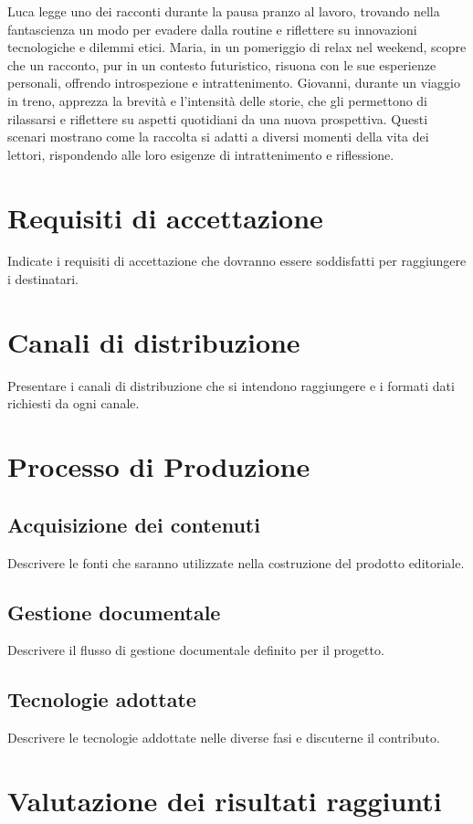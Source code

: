 \documentclass[a4paper,12pt]{article}
\begin{document}
Luca legge uno dei racconti durante la pausa pranzo al lavoro, trovando nella fantascienza un modo per evadere dalla routine e riflettere su innovazioni tecnologiche e dilemmi etici. Maria, in un pomeriggio di relax nel weekend, scopre che un racconto, pur in un contesto futuristico, risuona con le sue esperienze personali, offrendo introspezione e intrattenimento. Giovanni, durante un viaggio in treno, apprezza la brevità e l'intensità delle storie, che gli permettono di rilassarsi e riflettere su aspetti quotidiani da una nuova prospettiva. Questi scenari mostrano come la raccolta si adatti a diversi momenti della vita dei lettori, rispondendo alle loro esigenze di intrattenimento e riflessione.

\section*{Requisiti di accettazione}
Indicate i requisiti di accettazione che dovranno essere soddisfatti per raggiungere i destinatari. 

\section*{Canali di distribuzione}
Presentare i canali di distribuzione che si intendono raggiungere e i formati dati richiesti da ogni canale. 

\section*{Processo di Produzione}
\subsection*{Acquisizione dei contenuti}
Descrivere le fonti che saranno utilizzate nella costruzione del prodotto editoriale.

\subsection*{Gestione documentale}
Descrivere il flusso di gestione documentale definito per il progetto.

\subsection*{Tecnologie adottate}
Descrivere le tecnologie addottate nelle diverse fasi e discuterne il contributo.

\section*{Valutazione dei risultati raggiunti}
\end{document}
